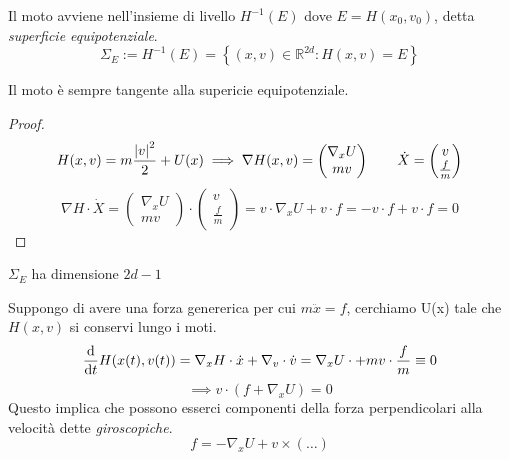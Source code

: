 Il moto avviene nell'insieme di livello $H^{-1}(E)$ dove $E = H(x_0,v_0)$, detta \textit{superficie equipotenziale}.
\begin{equation}
    \Sigma_E:= H^{-1}(E)=\left\{ (x,v) \in \mathbb{R}^{2d}:H(x,v)=E  \right\} 
\end{equation}

\begin{proposition}
    Il moto è sempre tangente alla supericie equipotenziale.
\end{proposition}
\begin{proof}
    \begin{equation*}
        H(x,v)= m\frac{\abs{v}^2}{2}+U(x) \implies 
        \nabla H(x,v)= 
        \begin{pmatrix}
            \nabla_xU\\mv 
        \end{pmatrix}
        \qquad \dot{X}= 
        \begin{pmatrix}
            v\\\frac{f}{m}
        \end{pmatrix}
    \end{equation*}
    \begin{equation*}
        \nabla H \cdot \dot{X}=  
        \begin{pmatrix}
            \nabla_xU\\mv 
        \end{pmatrix} \cdot
        \begin{pmatrix}
            v\\\frac{f}{m}
        \end{pmatrix}
        = v\cdot\nabla_xU +v\cdot f = -v \cdot f +v\cdot f = 0 
    \end{equation*}
\end{proof}

\begin{remark}
    $\Sigma_E $ ha dimensione $2d-1$
\end{remark}

Suppongo di avere una forza genererica per cui $m\ddot{x}= f $, cerchiamo U(x) tale che $H(x,v)$ si conservi lungo i moti.
\begin{equation*}
    \dv{}{t}H(x(t),v(t))= \nabla_xH\cdot\dot{x}+\nabla_v\cdot\dot{v}= \nabla_xU\cdot + mv\cdot \frac{f}{m}\equiv0
\end{equation*}
\begin{equation}
    \implies v \cdot \left( f + \nabla_xU \right)=0
\end{equation}
Questo implica che possono esserci componenti della forza perpendicolari alla velocità dette \textit{giroscopiche}.
\begin{equation}
    f= -\nabla_xU + v\times (\dots)
\end{equation}




